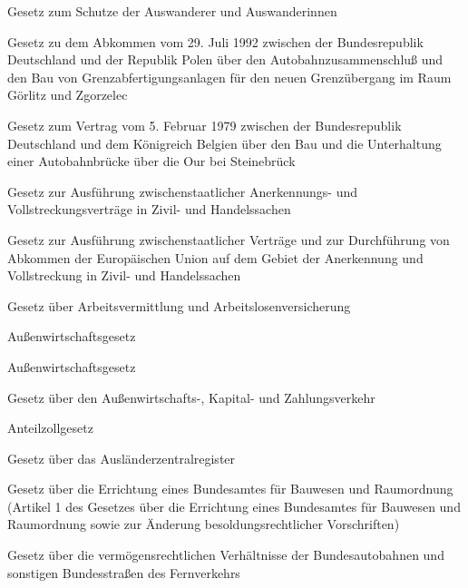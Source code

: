 \item[{AuswSG}] Gesetz zum Schutze der Auswanderer und Auswanderinnen

\item[{AutGAAPolAbkG}] Gesetz zu dem Abkommen vom 29. Juli 1992 zwischen der Bundesrepublik Deutschland und der Republik Polen über den Autobahnzusammenschluß und den Bau von Grenzabfertigungsanlagen für den neuen Grenzübergang im Raum Görlitz und Zgorzelec

\item[{AutobBrVtrBELG}] Gesetz zum Vertrag vom 5. Februar 1979 zwischen der Bundesrepublik Deutschland und dem Königreich Belgien über den Bau und die Unterhaltung einer Autobahnbrücke über die Our bei Steinebrück

\item[{AVAG}] Gesetz zur Ausführung zwischenstaatlicher Anerkennungs- und Vollstreckungsverträge in Zivil- und Handelssachen

\item[{AVAG-2001}] Gesetz zur Ausführung zwischenstaatlicher Verträge und zur Durchführung von Abkommen der Europäischen Union auf dem Gebiet der Anerkennung und Vollstreckung in Zivil- und Handelssachen

\item[{AVAVG}] Gesetz über Arbeitsvermittlung und Arbeitslosenversicherung

\item[{AWG}] Außenwirtschaftsgesetz

\item[{AWG-2013}] Außenwirtschaftsgesetz

\item[{AWKZG}] Gesetz über den Außenwirtschafts-, Kapital- und Zahlungsverkehr

\item[{AZG}] Anteilzollgesetz

\item[{AZRG}] Gesetz über das Ausländerzentralregister

\item[{BABauRaumOG}] Gesetz über die Errichtung eines Bundesamtes für Bauwesen und Raumordnung (Artikel 1 des Gesetzes über die Errichtung eines Bundesamtes für Bauwesen und Raumordnung sowie zur Änderung besoldungsrechtlicher Vorschriften)

\item[{BABG}] Gesetz über die vermögensrechtlichen Verhältnisse der Bundesautobahnen und sonstigen Bundesstraßen des Fernverkehrs

